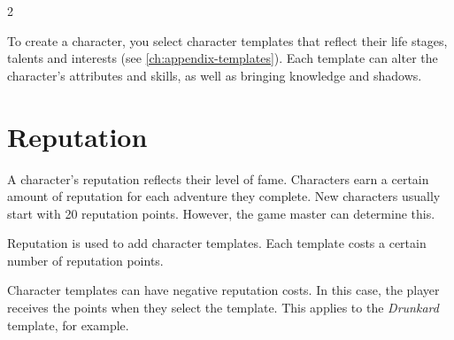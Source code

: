 \label{ch:create}

\begin{multicols}{2}

To create a character, you select character templates that reflect their life stages, talents and interests (see \cref{ch:appendix-templates}). Each template can alter the character's attributes and skills, as well as bringing knowledge and shadows.


\section{Reputation}

A character's reputation reflects their level of fame. Characters earn a certain amount of reputation for each adventure they complete. New characters usually start with 20 reputation points. However, the game master can determine this.

Reputation is used to add character templates. Each template costs a certain number of reputation points.

Character templates can have negative reputation costs. In this case, the player receives the points when they select the template. This applies to the \textit{Drunkard} template, for example.

\end{multicols}
